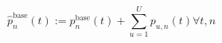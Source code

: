\begin{equation}
	\hat{p}^\text{base}_{n}(t) := p^\text{base}_{n}(t) + \sum_{u=1}^{U} p_{u,n}(t) \forall t, n
	\label{ch3:equ:updated-demand-profile}
\end{equation}